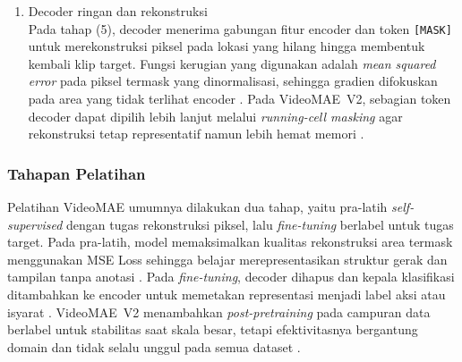 \begin{enumerate}
\item Decoder ringan dan rekonstruksi\\
Pada tahap (5), decoder menerima gabungan fitur encoder dan token \texttt{[MASK]} untuk merekonstruksi piksel pada lokasi yang hilang hingga membentuk kembali klip target. Fungsi kerugian yang digunakan adalah \textit{mean squared error} pada piksel termask yang dinormalisasi, sehingga gradien difokuskan pada area yang tidak terlihat encoder \cite{Tong2022VideoMAE}. Pada VideoMAE~V2, sebagian token decoder dapat dipilih lebih lanjut melalui \textit{running-cell masking} agar rekonstruksi tetap representatif namun lebih hemat memori \cite{Wang2023VideoMAEv2}.
\end{enumerate}

\subsubsection{Tahapan Pelatihan} \label{II.teori2.4.3}
Pelatihan VideoMAE umumnya dilakukan dua tahap, yaitu pra-latih \textit{self-supervised} dengan tugas rekonstruksi piksel, lalu \textit{fine-tuning} berlabel untuk tugas target. Pada pra-latih, model memaksimalkan kualitas rekonstruksi area termask menggunakan MSE Loss sehingga belajar merepresentasikan struktur gerak dan tampilan tanpa anotasi \cite{Tong2022VideoMAE}. Pada \textit{fine-tuning}, decoder dihapus dan kepala klasifikasi ditambahkan ke encoder untuk memetakan representasi menjadi label aksi atau isyarat \cite{Tong2022VideoMAE}. VideoMAE~V2 menambahkan \textit{post-pretraining} pada campuran data berlabel untuk stabilitas saat skala besar, tetapi efektivitasnya bergantung domain dan tidak selalu unggul pada semua dataset \cite{Wang2023VideoMAEv2}.

